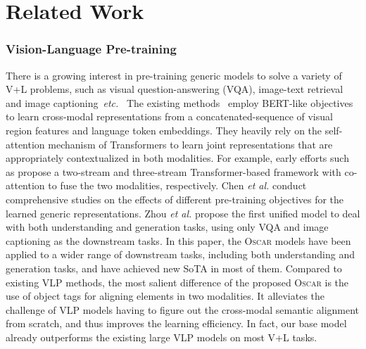 \documentclass[runningheads]{llncs}
\newcommand{\ea}[0]{\emph{et al. }}
\newcommand{\etc}[0]{\emph{etc.}}
\newcommand{\short}{\textsc{Oscar}}
\def\secvspace{{\vspace{-4mm}}}
\begin{document}
%
 \section{Related Work}

\subsubsection{Vision-Language Pre-training} There is a growing interest in pre-training generic models to solve a variety of V+L problems, such as visual question-answering (VQA), image-text retrieval and image captioning~\etc~
The existing methods~\cite{sun2019videobert,tan2019lxmert,lu2019vilbert,chen2019uniter,zhou2019unified,su2019vl,li2019unicoder,hao2020prevalent} employ BERT-like objectives~\cite{devlin2019bert} to learn cross-modal representations from a concatenated-sequence of visual region features and language token embeddings. They heavily rely on the self-attention mechanism of Transformers to learn joint representations that are appropriately contextualized in both modalities. For example, early efforts such as \cite{lu2019vilbert,tan2019lxmert} propose a two-stream and three-stream Transformer-based framework with co-attention to fuse the two modalities, respectively. Chen \ea \cite{chen2019uniter} conduct comprehensive studies on the effects of different pre-training objectives for the learned generic representations. Zhou \ea \cite{zhou2019unified} propose the first unified model to deal with both understanding and generation tasks, using only VQA and image captioning as the downstream tasks. In this paper, the \short{} models have been applied to a wider range of downstream tasks, including both understanding and generation tasks, and have achieved new SoTA in most of them.  
Compared to existing VLP methods, the most salient difference of the proposed \short{} is the use of object tags for aligning elements in two modalities. It alleviates the challenge of VLP models having to figure out the cross-modal semantic alignment from scratch, and thus improves the learning efficiency. In fact, our base model already outperforms the existing large VLP models on most V+L tasks.

\secvspace
\end{document}
